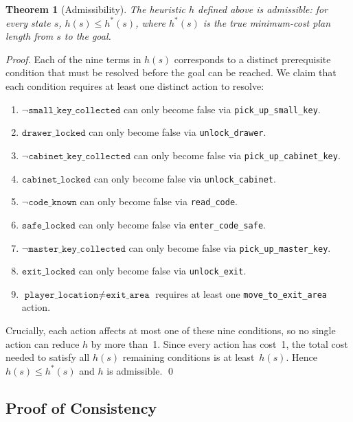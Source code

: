 \documentclass[12pt, a4paper]{report}
\newtheorem{theorem}{Theorem}[chapter]
\begin{document}
\begin{theorem}[Admissibility]
The heuristic $h$ defined above is admissible: for every state $s$,
$h(s) \leq h^*(s)$, where $h^*(s)$ is the true minimum-cost plan length from
$s$ to the goal.
\end{theorem}

\begin{proof}
Each of the nine terms in $h(s)$ corresponds to a distinct prerequisite
condition that must be resolved before the goal can be reached.  We claim that
each condition requires at least one distinct action to resolve:

\begin{enumerate}[leftmargin=1.5em]
  \item $\lnot\texttt{small\_key\_collected}$ can only become false via
        \texttt{pick\_up\_small\_key}.
  \item $\texttt{drawer\_locked}$ can only become false via
        \texttt{unlock\_drawer}.
  \item $\lnot\texttt{cabinet\_key\_collected}$ can only become false via
        \texttt{pick\_up\_cabinet\_key}.
  \item $\texttt{cabinet\_locked}$ can only become false via
        \texttt{unlock\_cabinet}.
  \item $\lnot\texttt{code\_known}$ can only become false via
        \texttt{read\_code}.
  \item $\texttt{safe\_locked}$ can only become false via
        \texttt{enter\_code\_safe}.
  \item $\lnot\texttt{master\_key\_collected}$ can only become false via
        \texttt{pick\_up\_master\_key}.
  \item $\texttt{exit\_locked}$ can only become false via
        \texttt{unlock\_exit}.
  \item $\texttt{player\_location} \neq \texttt{exit\_area}$ requires at least
        one \texttt{move\_to\_exit\_area} action.
\end{enumerate}

Crucially, each action affects at most one of these nine conditions, so no
single action can reduce $h$ by more than~1.  Since every action has cost~1,
the total cost needed to satisfy all $h(s)$ remaining conditions is at
least~$h(s)$.  Hence $h(s) \leq h^*(s)$ and $h$ is admissible. \qed
\end{proof}

\subsection{Proof of Consistency}
\end{document}
